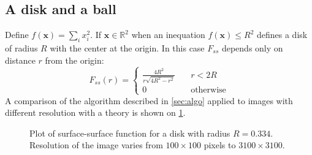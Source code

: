 \documentclass[reprint,amsmath,amssymb,aps,pre,showkeys,showpacs]{revtex4-1}
\begin{document}
\subsection{A disk and a ball}
Define $f(\bm{x}) = \sum_i x_i^2$. If $\bm{x} \in \mathbb{R}^2$ when an
inequation $f(\bm{x}) \le R^2$ defines a disk of radius $R$ with the center at
the origin. In this case $F_{ss}$ depends only on distance $r$ from the origin:
\begin{equation*}
  F_{ss}(r) = \left\{
  \begin{array}{ll}
    \frac{4R^2}{r\sqrt{4R^2-r^2}} & \quad r < 2R \\
    0 & \quad \text{otherwise}
  \end{array}
  \right.
\end{equation*}
A comparison of the algorithm described in \cref{sec:algo} applied to images
with different resolution with a theory is shown on \cref{fig:fss-disk}.
\begin{figure}[!hpt]
  \centering
  \hfill
  \caption[]{Plot of surface-surface function for a disk with radius
    $R = 0.334$. Resolution of the image varies from $100\times 100$ pixels to
    $3100\times 3100$.}
  \label{fig:fss-disk}
\end{figure}
\end{document}
